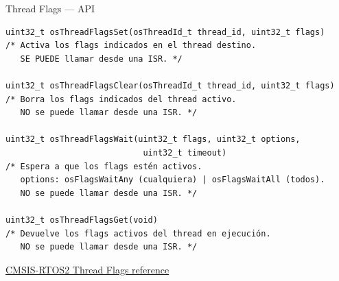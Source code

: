 \begin{frame}[fragile]{Thread Flags — API}
    \begin{verbatim}
uint32_t osThreadFlagsSet(osThreadId_t thread_id, uint32_t flags)
/* Activa los flags indicados en el thread destino.
   SE PUEDE llamar desde una ISR. */

uint32_t osThreadFlagsClear(osThreadId_t thread_id, uint32_t flags)
/* Borra los flags indicados del thread activo.
   NO se puede llamar desde una ISR. */

uint32_t osThreadFlagsWait(uint32_t flags, uint32_t options,
                            uint32_t timeout)
/* Espera a que los flags estén activos.
   options: osFlagsWaitAny (cualquiera) | osFlagsWaitAll (todos).
   NO se puede llamar desde una ISR. */

uint32_t osThreadFlagsGet(void)
/* Devuelve los flags activos del thread en ejecución.
   NO se puede llamar desde una ISR. */
    \end{verbatim}
    \vspace{4pt}
    \href{https://arm-software.github.io/CMSIS_5/RTOS2/html/group__CMSIS__RTOS__ThreadFlagsMgmt.html}
    {CMSIS-RTOS2 Thread Flags reference}
\end{frame}

